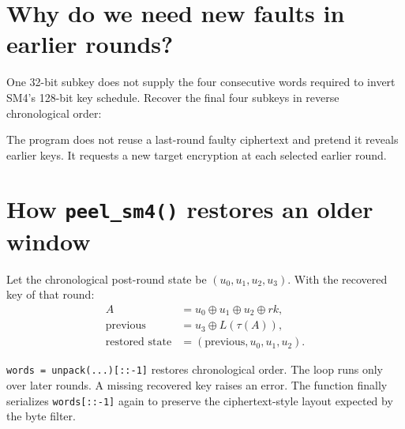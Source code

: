 \documentclass[11pt,a4paper]{report}
\newcommand{\xor}{\mathbin{\oplus}}
\begin{document}
\section{Why do we need new faults in earlier rounds?}
One 32-bit subkey does not supply the four consecutive words required to invert SM4's 128-bit key schedule. Recover the final four subkeys in reverse chronological order:
\begin{center}
\end{center}
The program does not reuse a last-round faulty ciphertext and pretend it reveals earlier keys. It requests a new target encryption at each selected earlier round.

\section{How \texttt{peel\_sm4()} restores an older window}
Let the chronological post-round state be \((u_0,u_1,u_2,u_3)\). With the recovered key of that round:
\begin{align*}
A&=u_0\xor u_1\xor u_2\xor rk,\\
\text{previous}&=u_3\xor L(\tau(A)),\\
\text{restored state}&=(\text{previous},u_0,u_1,u_2).
\end{align*}
\begin{center}
\end{center}
\texttt{words = unpack(...)[::-1]} restores chronological order. The loop runs only over later rounds. A missing recovered key raises an error. The function finally serializes \texttt{words[::-1]} again to preserve the ciphertext-style layout expected by the byte filter.
\end{document}
